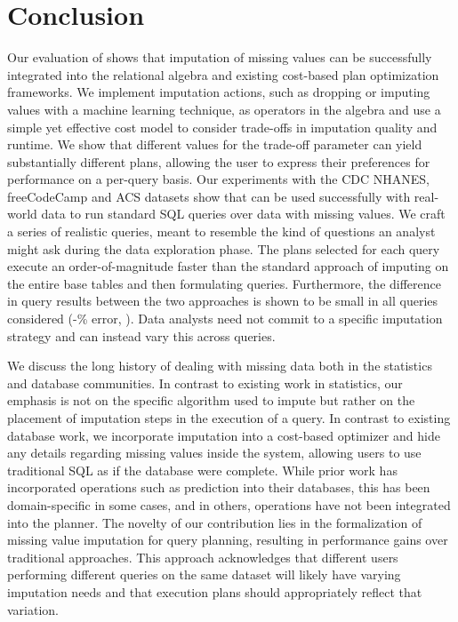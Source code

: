 \section{Conclusion}
Our evaluation of \ProjectName{} shows that imputation of missing values can be successfully integrated into the relational algebra and
existing cost-based plan optimization frameworks. We implement imputation actions, such as dropping or imputing values with a machine
learning technique, as operators in the algebra and use a simple yet effective cost model to consider trade-offs in 
imputation quality and runtime. We show that different values for the trade-off parameter can yield substantially
different plans, allowing the user to express their preferences for performance on a per-query basis.
Our experiments with the CDC NHANES, freeCodeCamp and ACS datasets
show that \ProjectName{} can be used successfully with real-world data to run standard SQL queries over data with missing values. 
We craft a series of realistic queries, meant to resemble the kind of questions an analyst might ask during
the data exploration phase. The plans selected for each query execute an order-of-magnitude faster than
 the standard approach of imputing on the entire base tables and
then formulating queries. Furthermore, the difference in query results between the two approaches is
shown to be small in all queries considered (\lowsmapealphazero{}-\highsmapealphaone{}\% error, ). Data analysts need not commit to a specific imputation strategy and can instead
vary this across queries.

We discuss the long history of dealing with missing data both in the statistics and database communities.
In contrast to existing work in statistics, our emphasis is not on the specific algorithm
used to impute but rather on the placement of imputation steps in the execution of a query. In contrast to existing database work,
we incorporate imputation into a cost-based optimizer and hide any details
regarding missing values inside the system, allowing users to use traditional SQL as if the database were complete.
While prior work has incorporated operations such as prediction into their databases, this has been domain-specific
in some cases, and in others, operations have not been integrated into the planner. The novelty
of our contribution lies in the formalization of missing value imputation for query planning, resulting in performance
gains over traditional approaches. This approach acknowledges that different users performing different queries on the same
dataset will likely have varying imputation needs and that execution plans should appropriately reflect that variation.

